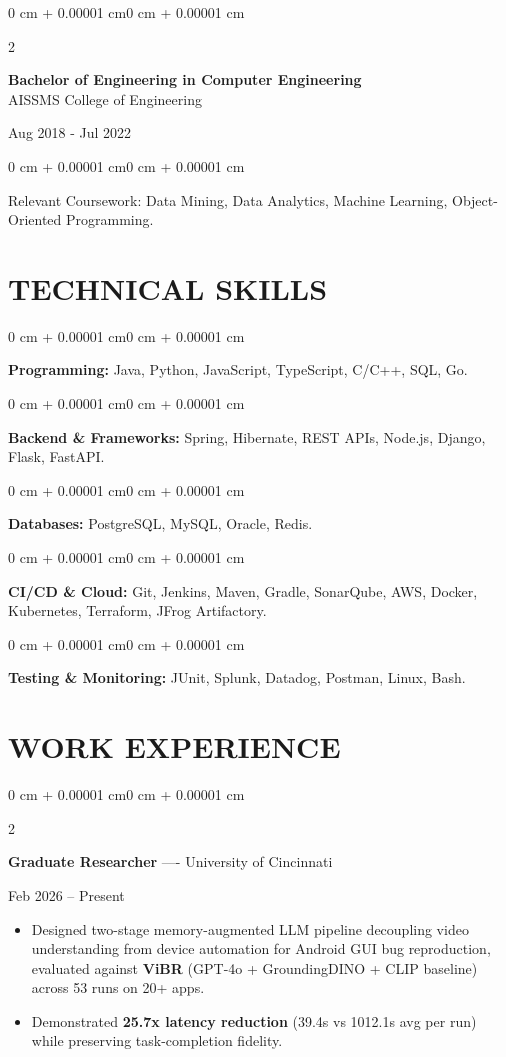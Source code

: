 \documentclass[10pt, letterpaper]{article}
\newenvironment{highlights}{
    \begin{itemize}[
        topsep=0.10 cm,
        parsep=0.06 cm,
        partopsep=0pt,
        itemsep=0.06 cm,
        leftmargin=12pt
    ]
}{
    \end{itemize}
}
\newenvironment{onecolentry}{
    \begin{adjustwidth}{0 cm + 0.00001 cm}{0 cm + 0.00001 cm}
}{
    \end{adjustwidth}
}
\newenvironment{twocolentry}[2][]{
    \onecolentry
    \def\secondColumn{#2}
    \setcolumnwidth{\fill, 4.5 cm}
    \begin{paracol}{2}
}{
    \switchcolumn \raggedleft \secondColumn
    \end{paracol}
    \endonecolentry
}
\begin{document}
\begin{twocolentry}{
    Aug 2018 - Jul 2022
}
    \textbf{Bachelor of Engineering in Computer Engineering} \\
    AISSMS College of Engineering
\end{twocolentry}
\begin{onecolentry}
Relevant Coursework: Data Mining, Data Analytics, Machine Learning, Object-Oriented Programming.
\end{onecolentry}
\section{TECHNICAL SKILLS}
\begin{onecolentry}
\textbf{Programming:} Java, Python, JavaScript, TypeScript, C/C++, SQL, Go.
\end{onecolentry}
\vspace{0.06 cm}
\begin{onecolentry}
\textbf{Backend \& Frameworks:} Spring, Hibernate, REST APIs, Node.js, Django, Flask, FastAPI.
\end{onecolentry}
\vspace{0.06 cm}
\begin{onecolentry}
\textbf{Databases:} PostgreSQL, MySQL, Oracle, Redis.
\end{onecolentry}
\vspace{0.06 cm}
\begin{onecolentry}
\textbf{CI/CD \& Cloud:} Git, Jenkins, Maven, Gradle, SonarQube, AWS, Docker, Kubernetes, Terraform, JFrog Artifactory.
\end{onecolentry}
\vspace{0.06 cm}
\begin{onecolentry}
\textbf{Testing \& Monitoring:} JUnit, Splunk, Datadog, Postman, Linux, Bash.
\end{onecolentry}

\section{WORK EXPERIENCE}
\begin{twocolentry}{Feb 2026 -- Present}
\textbf{Graduate Researcher} ---- University of Cincinnati
\end{twocolentry}
\begin{highlights}
  \item Designed two-stage memory-augmented LLM pipeline decoupling video understanding from device automation for Android GUI bug reproduction, evaluated against \textbf{ViBR} (GPT-4o + GroundingDINO + CLIP baseline) across 53 runs on 20+ apps.
  \item Demonstrated \textbf{25.7x latency reduction} (39.4s vs 1012.1s avg per run) while preserving task-completion fidelity.
\end{highlights}
\end{document}
